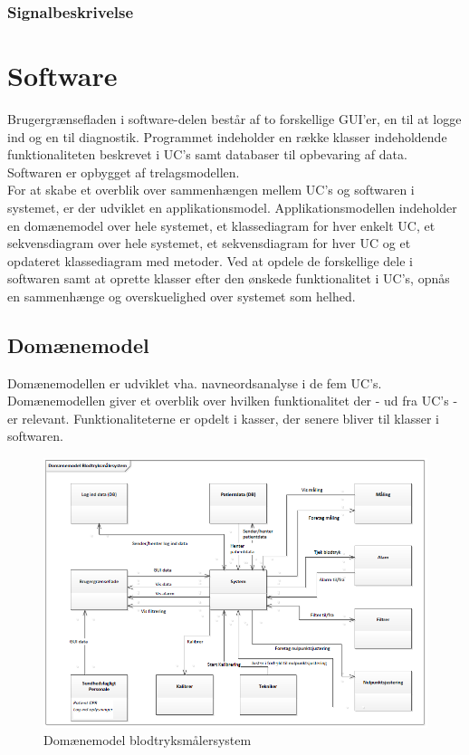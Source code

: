 \subsubsection{Signalbeskrivelse}

\section{Software}
Brugergrænsefladen i software-delen består af to forskellige GUI'er, en til at logge ind og en til diagnostik. Programmet indeholder en række klasser indeholdende funktionaliteten beskrevet i UC's samt databaser til opbevaring af data. Softwaren er opbygget af trelagsmodellen. \\
\newline
For at skabe et overblik over sammenhængen mellem UC's og softwaren i systemet, er der udviklet en applikationsmodel. Applikationsmodellen indeholder en domænemodel over hele systemet, et klassediagram for hver enkelt UC, et sekvensdiagram over hele systemet, et sekvensdiagram for hver UC og et opdateret klassediagram med metoder. Ved at opdele de forskellige dele i softwaren samt at oprette klasser efter den ønskede funktionalitet i UC's, opnås en sammenhænge og overskuelighed over systemet som helhed.
\subsection{Domænemodel}
Domænemodellen er udviklet vha. navneordsanalyse i de fem UC's. Domænemodellen giver et overblik over hvilken funktionalitet der - ud fra UC's - er relevant. Funktionaliteterne er opdelt i kasser, der senere bliver til klasser i softwaren. 

\begin{figure}[H]
\centering
\includegraphics[scale=0.70]{dom.PNG}
\caption{Domænemodel blodtryksmålersystem}
\end{figure}

